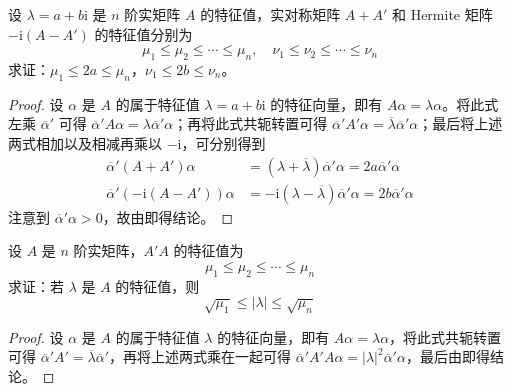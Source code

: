 \documentclass[../../main.tex]{subfiles}%
\begin{document}
\begin{example}\label{example:例9.54}
设 \(\lambda = a + b\mathrm{i}\) 是 \(n\) 阶实矩阵 \(A\) 的特征值，实对称矩阵 \(A + A'\) 和 Hermite 矩阵 \(-\mathrm{i}(A - A')\) 的特征值分别为
\[
\mu_1 \leqslant  \mu_2 \leqslant  \cdots \leqslant  \mu_n,\quad \nu_1 \leqslant  \nu_2 \leqslant  \cdots \leqslant  \nu_n
\]
求证：\(\mu_1 \leqslant  2a \leqslant  \mu_n\)，\(\nu_1 \leqslant  2b \leqslant  \nu_n\)。
\end{example}
\begin{proof}
设 \(\alpha\) 是 \(A\) 的属于特征值 \(\lambda = a + b\mathrm{i}\) 的特征向量，即有 \(A\alpha = \lambda\alpha\)。将此式左乘 \(\overline{\alpha}'\) 可得 \(\overline{\alpha}'A\alpha = \lambda\overline{\alpha}'\alpha\)；再将此式共轭转置可得 \(\overline{\alpha}'A'\alpha = \overline{\lambda}\overline{\alpha}'\alpha\)；最后将上述两式相加以及相减再乘以 \(-\mathrm{i}\)，可分别得到
\begin{align*}
\overline{\alpha}'(A + A')\alpha &= (\lambda + \overline{\lambda})\overline{\alpha}'\alpha = 2a\overline{\alpha}'\alpha\\
\overline{\alpha}'(-\mathrm{i}(A - A'))\alpha &= -\mathrm{i}(\lambda - \overline{\lambda})\overline{\alpha}'\alpha = 2b\overline{\alpha}'\alpha
\end{align*}
注意到 \(\overline{\alpha}'\alpha > 0\)，故由即得结论。 
\end{proof}

\begin{example}\label{example:例9.55}
设 \(A\) 是 \(n\) 阶实矩阵，\(A'A\) 的特征值为
\[
\mu_1 \leqslant  \mu_2 \leqslant  \cdots \leqslant  \mu_n
\]
求证：若 \(\lambda\) 是 \(A\) 的特征值，则
\[
\sqrt{\mu_1} \leqslant  |\lambda| \leqslant  \sqrt{\mu_n}
\]
\end{example}
\begin{proof}
设 \(\alpha\) 是 \(A\) 的属于特征值 \(\lambda\) 的特征向量，即有 \(A\alpha = \lambda\alpha\)，将此式共轭转置可得 \(\overline{\alpha}'A' = \overline{\lambda}\overline{\alpha}'\)，再将上述两式乘在一起可得 \(\overline{\alpha}'A'A\alpha = |\lambda|^2\overline{\alpha}'\alpha\)，最后由即得结论。 \end{proof}
\end{document}
